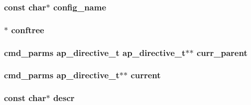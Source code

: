 \subsubsection[{\texorpdfstring{config\+\_\+name}{config_name}}]{ const char$\ast$ config\+\_\+name}\hypertarget{group__APACHE__CORE__CONFIG_ga7091e2a62ce17dbe9a86c121ec873dc7}{}\label{group__APACHE__CORE__CONFIG_ga7091e2a62ce17dbe9a86c121ec873dc7}
\subsubsection[{\texorpdfstring{conftree}{conftree}}]{ $\ast$ conftree}\hypertarget{group__APACHE__CORE__CONFIG_gafb5c2ed2ff2c064ef1b2c1f8bf52e112}{}\label{group__APACHE__CORE__CONFIG_gafb5c2ed2ff2c064ef1b2c1f8bf52e112}
\subsubsection[{\texorpdfstring{curr\+\_\+parent}{curr_parent}}]{ {\bf cmd\+\_\+parms} {\bf ap\+\_\+directive\+\_\+t} {\bf ap\+\_\+directive\+\_\+t}$\ast$$\ast$ curr\+\_\+parent}\hypertarget{group__APACHE__CORE__CONFIG_ga0fda942ffe70ed3752b85c84a9214c2c}{}\label{group__APACHE__CORE__CONFIG_ga0fda942ffe70ed3752b85c84a9214c2c}
\subsubsection[{\texorpdfstring{current}{current}}]{ {\bf cmd\+\_\+parms} {\bf ap\+\_\+directive\+\_\+t}$\ast$$\ast$ current}\hypertarget{group__APACHE__CORE__CONFIG_ga4b3e87cb39cac2296c5083f27321f1f4}{}\label{group__APACHE__CORE__CONFIG_ga4b3e87cb39cac2296c5083f27321f1f4}
\subsubsection[{\texorpdfstring{descr}{descr}}]{\setlength{\rightskip}{0pt plus 5cm}const char$\ast$ descr}\hypertarget{group__APACHE__CORE__CONFIG_gabf794d6208a15a1b5b0d4d15ca3cbdd3}{}\label{group__APACHE__CORE__CONFIG_gabf794d6208a15a1b5b0d4d15ca3cbdd3}
